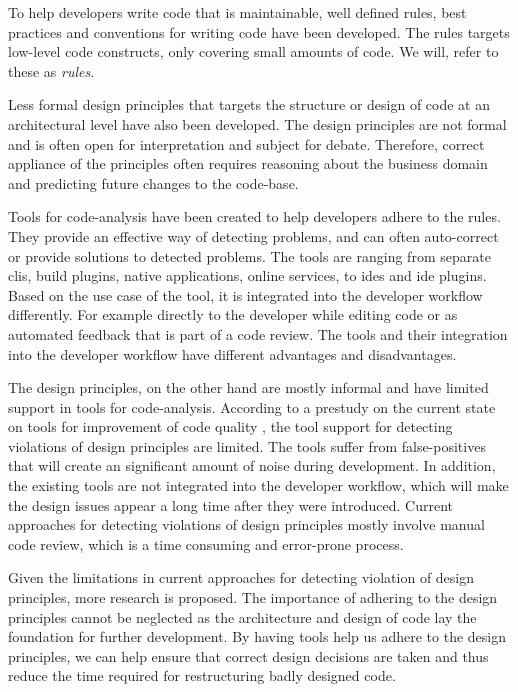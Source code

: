 \documentclass[pdftex,10pt,b5paper,twoside]{report}
\begin{document}
To help developers write code that is maintainable, well defined rules, best practices and conventions for writing code have been developed. The rules targets low-level code constructs, only covering small amounts of code. We will, refer to these as \textit{rules}.

Less formal design principles that targets the structure or design of code at an architectural level have also been developed. The design principles are not formal and is often open for interpretation and subject for debate. Therefore, correct appliance of the principles often requires reasoning about the business domain and predicting future changes to the code-base. 

Tools for code-analysis have been created to help developers adhere to the rules. They provide an effective way of detecting problems, and can often auto-correct or provide solutions to detected problems. The tools are ranging from separate \gls{cli}s, build plugins, native applications, online services, to \gls{ide}s and \gls{ide} plugins. Based on the use case of the tool, it is integrated into the developer workflow differently. For example directly to the developer while editing code or as automated feedback that is part of a code review.  The tools and their integration into the developer workflow have different advantages and disadvantages.

The design principles, on the other hand are mostly informal and have limited support in tools for code-analysis. According to a prestudy on the current state on tools for improvement of code quality \cite{prestudy}, the tool support for detecting violations of design principles are limited. The tools suffer from false-positives that will create an significant amount of noise during development. In addition, the existing tools are not integrated into the developer workflow, which will make the design issues appear a long time after they were introduced. Current approaches for detecting violations of design principles mostly involve manual code review, which is a time consuming and error-prone process.

Given the limitations in current approaches for detecting violation of design principles, more research is proposed. The importance of adhering to the design principles cannot be neglected as the architecture and design of code lay the foundation for further development. By having tools help us adhere to the design principles, we can help ensure that correct design decisions are taken and thus reduce the time required for restructuring badly designed code.  
\end{document}
